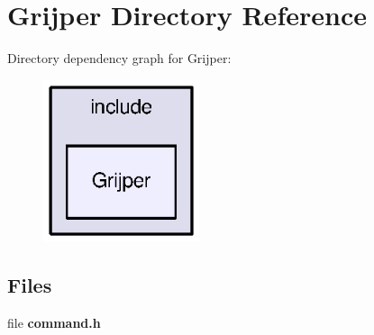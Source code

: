 \section{Grijper Directory Reference}
\label{dir_61a6a7d605fbda1c5ab1c3b30dfd4f79}
Directory dependency graph for Grijper\-:\nopagebreak
\begin{figure}[H]
\begin{center}
\leavevmode
\includegraphics[width=130pt]{dir_61a6a7d605fbda1c5ab1c3b30dfd4f79_dep}
\end{center}
\end{figure}
\subsection*{Files}
\begin{DoxyCompactItemize}
\item 
file {\bf command.\-h}
\end{DoxyCompactItemize}

